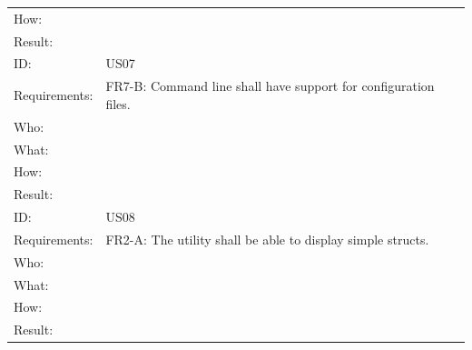 \begin{table}[htbp]
{\begin{tabularx}{1.2\textwidth}{l X}
	How:			&  \\
	Result:		&  \\
	\midrule
	ID:			& US07 \\
	Requirements:	&  FR7-B: Command line shall have support for configuration files. \\
	Who:			&  \\
	What:		&  \\
	How:			&  \\
	Result:		&  \\
	\midrule
	ID:			& US08 \\
	Requirements:	&  FR2-A: The utility shall be able to display simple structs. \\
	Who:			&  \\
	What:		&  \\
	How:			&  \\
	Result:		&  \\
	\bottomrule
\end{tabularx}}
\end{table}

